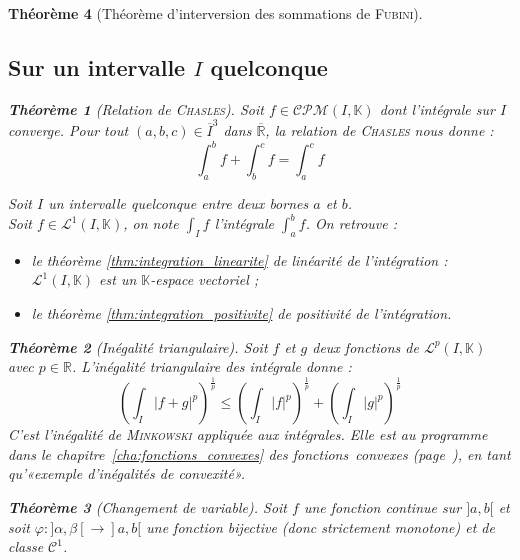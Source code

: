 \documentclass[11pt,a4paper]{report}
\newtheorem{theorem}{Théorème}[chapter]
\newtheorem{itheorem}[theorem]{Théorème}
\theoremstyle{definition}
\begin{document}
\begin{theorem}[Théorème d'interversion des sommations de \textsc{Fubini}]
{{%
\subsection{Sur un intervalle $I$ quelconque} %
\label{sub:sur_un_intervalle_i}
\begin{theorem}[Relation de \textsc{Chasles}]
     Soit $f \in \mathcal{CPM}(I,\mathbb{K})$ dont l'intégrale sur $I$ converge. Pour tout $(a,b,c)\in \overline{I}^3$ dans $\overline{\ensuremath{\mathbb{R}}}$, la \emph{relation de \textsc{Chasles}} nous donne : 
     \begin{equation}
     \int_a^b f + \int_b^c f = \int_a^c f \tag{Chasles}
     \end{equation}
\end{theorem}
Soit $I$ un intervalle quelconque entre deux bornes $a$ et $b$. \\
Soit $f\in \mathcal{L}^1(I,\mathbb{K})$, on note $\int_I f$ l'intégrale $\int_a^b f$. On retrouve :
\begin{itemize}[label=$-$]
    \item le théorème \ref{thm:integration_linearite} de linéarité de l'intégration : $\mathcal{L}^1(I,\mathbb{K})$ est un $\mathbb{K}$-espace vectoriel ;
    \item le théorème \ref{thm:integration_positivite} de positivité de l'intégration.
\end{itemize}
\begin{theorem}[Inégalité triangulaire]
    Soit $f$ et $g$ deux fonctions de $\mathcal{L}^p(I,\mathbb{K})$ avec $p\in \ensuremath{\mathbb{R}}$. L'\emph{inégalité triangulaire} des intégrale donne :
     \begin{equation}
     \left(\int_I|f+g|^p \right)^{\frac 1 p} \leq \left(\int_I|f|^p\right)^{\frac 1 p}+\left(\int_I|g|^p\right)^{\frac 1 p}
     \end{equation}
     C'est l'inégalité de \textsc{Minkowski} appliquée aux intégrales. Elle est au programme dans le chapitre~\ref{cha:fonctions_convexes} des fonctions~convexes (page~\pageref{cha:fonctions_convexes}), en tant qu'«{}exemple d'inégalités de convexité»{}.
\end{theorem}
\begin{itheorem}[Changement de variable]
     Soit $f$ une fonction \emph{continue} sur $]a,b[$ et soit ${\varphi : ]\alpha , \beta [ \to ]a,b[}$ une fonction \emph{bijective} (donc strictement monotone) et de classe $\mathscr{C}^1$. \\

\end{itheorem}}}
\end{theorem}
\end{document}
